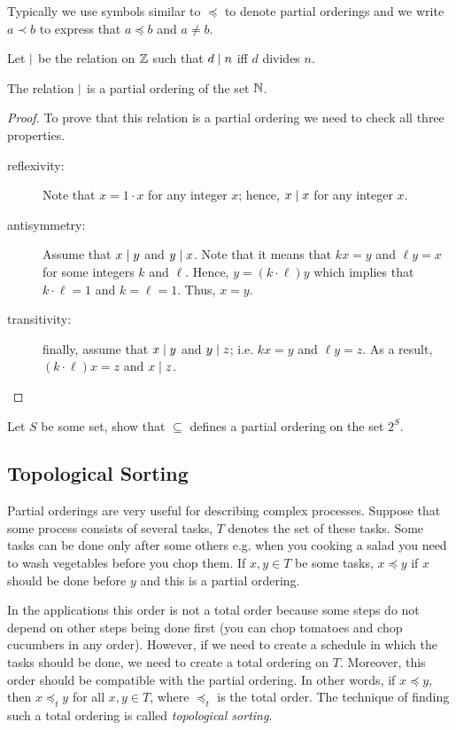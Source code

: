 Typically we use symbols similar to $\preceq$ to denote partial orderings and we
write $a \prec b$ to express that $a \preceq b$ and $a \neq b$.

Let $\mid$ be the relation on $\mathbb{Z}$ such that $d \mid n$ iff $d$
divides $n$.
\begin{theorem}
  The relation $\mid$ is a partial ordering of the set $\mathbb{N}$.
\end{theorem}
\begin{proof}
  To prove that this relation is a partial ordering we need to check all three
  properties.
  \begin{description}
    \item[reflexivity:] Note that $x = 1 \cdot x$ for any integer $x$;
      hence, $x \mid x$ for any integer $x$.
    \item[antisymmetry:] Assume that $x \mid y$ and $y \mid x$. Note
      that it means that $k x = y$ and $\ell y = x$ for some integers $k$ and
      $\ell$. Hence, $y = (k \cdot \ell) y$ which implies that
      $k \cdot \ell = 1$ and $k = \ell = 1$. Thus, $x = y$.
    \item[transitivity:] finally, assume that $x \mid y$ and $y \mid z$;
    i.e. $k x = y$ and $\ell y = z$. As a result, $(k \cdot \ell) x = z$ and
    $x \mid z$.
  \end{description}
\end{proof}

\begin{exercise}
  Let $S$ be some set, show that $\subseteq$ defines a partial ordering on the
  set $2^S$.
\end{exercise}

\subsection{Topological Sorting}
Partial orderings are very useful for describing complex processes. Suppose
that some process consists of several tasks, $T$ denotes the set of these tasks.
Some tasks can be done only after some others e.g. when you cooking a salad you
need to wash vegetables before you chop them. If $x, y \in T$ be some tasks, $x
\preceq y$ if $x$ should be done before $y$ and this is a partial ordering.

In the applications this order is not a total order because some steps do not
depend on other steps being done first (you can chop tomatoes and chop
cucumbers in any order). However, if we need to create a schedule in which the
tasks should be done, we need to create a total ordering on $T$. Moreover, this
order should be compatible with the partial ordering. In other words, if $x
\preceq y$, then $x \preceq_t y$ for all $x, y \in T$, where $\preceq_t$ is the
total order. The technique of finding such a total ordering is called
\emph{topological sorting}.

